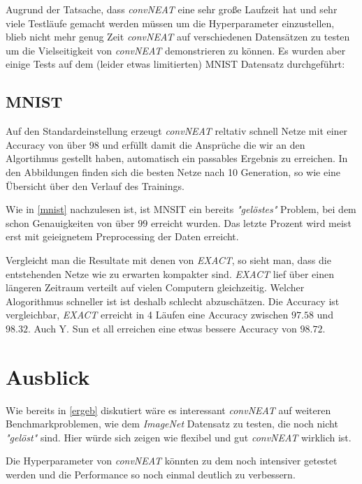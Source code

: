 \documentclass[]{scrartcl}
\begin{document}
		Augrund der Tatsache, dass \textit{convNEAT} eine sehr große Laufzeit hat und sehr viele Testläufe gemacht werden müssen um die Hyperparameter einzustellen, blieb nicht mehr genug Zeit
		\textit{convNEAT} auf verschiedenen Datensätzen zu testen um die Vielseitigkeit von \textit{convNEAT} demonstrieren zu können.
		Es wurden aber einige Tests auf dem (leider etwas limitierten) MNIST Datensatz durchgeführt:

		\subsection{MNIST}
			
			Auf den Standardeinstellung erzeugt \textit{convNEAT} reltativ schnell Netze mit einer Accuracy von über $98$ und erfüllt damit die Ansprüche die wir an
			den Algortihmus gestellt haben, automatisch ein passables Ergebnis zu erreichen.
			In den Abbildungen finden sich die besten Netze nach 10 Generation, so wie eine Übersicht über den Verlauf des Trainings.


			Wie in \ref{mnist} nachzulesen ist, ist MNSIT ein bereits \textit{"gelöstes"} Problem, bei dem schon Genauigkeiten von über $99$ erreicht wurden.
			Das letzte Prozent wird meist erst mit geieignetem Preprocessing der Daten erreicht.

			Vergleicht man die Resultate mit denen von \textit{EXACT}, so sieht man, dass die entstehenden Netze wie zu erwarten kompakter sind.
			\textit{EXACT} lief über einen längeren Zeitraum verteilt auf vielen Computern gleichzeitig.
			Welcher Alogorithmus schneller ist ist deshalb schlecht abzuschätzen.
			Die Accuracy ist vergleichbar, \textit{EXACT} erreicht in 4 Läufen eine Accuracy zwischen $97.58$ und $98.32$.
			Auch Y. Sun et all erreichen eine etwas bessere Accuracy von $98.72$.

		
	\section{Ausblick}

		Wie bereits in \ref{ergeb} diskutiert wäre es interessant \textit{convNEAT} auf weiteren Benchmarkproblemen, wie dem \textit{ImageNet} Datensatz zu testen,
		die noch nicht \textit{"gelöst"} sind. Hier würde sich zeigen wie flexibel und gut \textit{convNEAT} wirklich ist.

		Die Hyperparameter von \textit{convNEAT} könnten zu dem noch intensiver getestet werden und die Performance so noch einmal deutlich zu verbessern.

\clearpage

\printbibliography[heading=bibintoc, title={References}]
\end{document}
